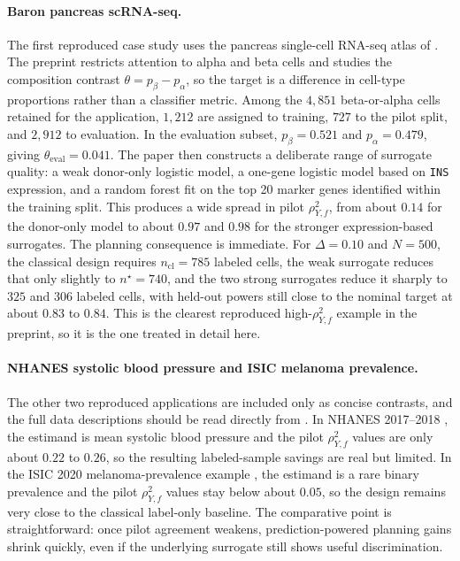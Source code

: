 \paragraph{Baron pancreas scRNA-seq.}
The first reproduced case study uses the pancreas single-cell RNA-seq atlas of \textcite{baron2016single}. The preprint restricts attention to alpha and beta cells and studies the composition contrast \(\theta = p_{\beta}-p_{\alpha}\), so the target is a difference in cell-type proportions rather than a classifier metric. Among the \(4{,}851\) beta-or-alpha cells retained for the application, \(1{,}212\) are assigned to training, \(727\) to the pilot split, and \(2{,}912\) to evaluation. In the evaluation subset, \(p_{\beta}=0.521\) and \(p_{\alpha}=0.479\), giving \(\theta_{\mathrm{eval}}=0.041\). The paper then constructs a deliberate range of surrogate quality: a weak donor-only logistic model, a one-gene logistic model based on \texttt{INS} expression, and a random forest fit on the top 20 marker genes identified within the training split. This produces a wide spread in pilot \(\rho_{Y,f}^2\), from about \(0.14\) for the donor-only model to about \(0.97\) and \(0.98\) for the stronger expression-based surrogates. The planning consequence is immediate. For \(\Delta=0.10\) and \(N=500\), the classical design requires \(n_{\mathrm{cl}}=785\) labeled cells, the weak surrogate reduces that only slightly to \(n^\star=740\), and the two strong surrogates reduce it sharply to \(325\) and \(306\) labeled cells, with held-out powers still close to the nominal target at about \(0.83\) to \(0.84\). This is the clearest reproduced high-\(\rho_{Y,f}^2\) example in the preprint, so it is the one treated in detail here.

\paragraph{NHANES systolic blood pressure and ISIC melanoma prevalence.}
The other two reproduced applications are included only as concise contrasts, and the full data descriptions should be read directly from \textcite{ppi_power}. In NHANES 2017--2018 \parencite{nhanes2020}, the estimand is mean systolic blood pressure and the pilot \(\rho_{Y,f}^2\) values are only about \(0.22\) to \(0.26\), so the resulting labeled-sample savings are real but limited. In the ISIC 2020 melanoma-prevalence example \parencite{rotemberg2021patient}, the estimand is a rare binary prevalence and the pilot \(\rho_{Y,f}^2\) values stay below about \(0.05\), so the design remains very close to the classical label-only baseline. The comparative point is straightforward: once pilot agreement weakens, prediction-powered planning gains shrink quickly, even if the underlying surrogate still shows useful discrimination.

